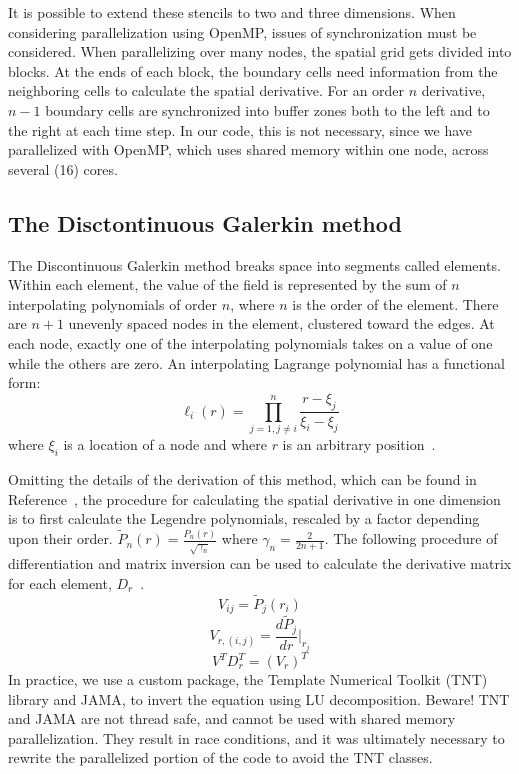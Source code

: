 It is possible to extend these stencils to two and three dimensions. When considering parallelization using OpenMP, issues of synchronization must be considered. When parallelizing over many nodes, the spatial grid gets divided into blocks. At the ends of each block, the boundary cells need information from the neighboring cells to calculate the spatial derivative. For an order $n$ derivative, $n-1$ boundary cells are synchronized into buffer zones both to the left and to the right at each time step. In our code, this is not necessary, since we have parallelized with OpenMP, which uses shared memory within one node, across several (16) cores.

\subsection{The Disctontinuous Galerkin method}
The Discontinuous Galerkin method breaks space into segments called elements. Within each element, the value of the field is represented by the sum of $n$ interpolating polynomials of order $n$, where $n$ is the order of the element. There are $n+1$ unevenly spaced nodes in the element, clustered toward the edges. At each node, exactly one of the interpolating polynomials takes on a value of one while the others are zero. An interpolating Lagrange polynomial has a functional form:
\begin{equation}
  \ell_i(r)=\prod_{j=1,j\ne i}^{n}\frac{r-\xi_j}{\xi_i-\xi_j}
\end{equation}
where $\xi_i$ is a location of a node and where $r$ is an arbitrary position~\cite{dghesthaven}. 


Omitting the details of the derivation of this method, which can be found in Reference~\cite{dghesthaven}, the procedure for calculating the spatial derivative in one dimension is to first calculate the Legendre polynomials, rescaled by a factor depending upon their order. $\tilde{P}_n(r)=\frac{P_n(r)}{\sqrt{\gamma_n}}$ where $\gamma_n=\frac{2}{2n+1}$. The following procedure of differentiation and matrix inversion can be used to calculate the derivative matrix for each element, $D_r$~\cite{dghesthaven}.
\begin{equation}
  V_{ij}=\tilde{P}_j(r_i)
\end{equation}
\begin{equation}
  V_{r,(i,j)}=\frac{d\tilde{P}_j}{dr}|_{r_j}
\end{equation}
\begin{equation}
  V^TD_r^T=(V_r)^T
\end{equation}
In practice, we use a custom package, the Template Numerical Toolkit (TNT) library and JAMA, to invert the equation using LU decomposition. Beware! TNT and JAMA are not thread safe, and cannot be used with shared memory parallelization. They result in race conditions, and it was ultimately necessary to rewrite the parallelized portion of the code to avoid the TNT classes.


